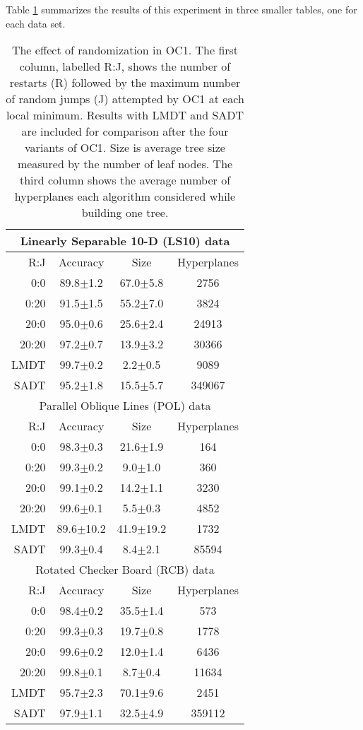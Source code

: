 Table \ref{table:2} summarizes the results of this experiment in
three smaller tables, one for each data set.
\begin{table}
\begin{center}
\begin{tabular}{|r|ccc|} \hline \hline
\multicolumn{4}{|c|}{Linearly Separable 10-D (LS10) data} \\ \hline 
R:J & Accuracy & Size  & Hyperplanes \\ \hline
0:0   & 89.8$\pm$1.2 & 67.0$\pm$5.8 & 2756 \\
0:20  & 91.5$\pm$1.5 & 55.2$\pm$7.0 & 3824 \\
20:0  & 95.0$\pm$0.6 & 25.6$\pm$2.4 & 24913 \\
20:20 & 97.2$\pm$0.7 & 13.9$\pm$3.2 & 30366 \\ \hline
LMDT  & 99.7$\pm$0.2 &  2.2$\pm$0.5 & 9089 \\ \hline
SADT  & 95.2$\pm$1.8 & 15.5$\pm$5.7 & 349067 \\ \hline  \hline
\multicolumn{4}{|c|}{Parallel Oblique Lines (POL) data} \\ \hline 
R:J & Accuracy & Size  & Hyperplanes \\ \hline
0:0   & 98.3$\pm$0.3 & 21.6$\pm$1.9 & 164 \\
0:20  & 99.3$\pm$0.2 &  9.0$\pm$1.0 & 360 \\
20:0  & 99.1$\pm$0.2 & 14.2$\pm$1.1 & 3230 \\
20:20 & 99.6$\pm$0.1 &  5.5$\pm$0.3 & 4852 \\ \hline
LMDT  & 89.6$\pm$10.2& 41.9$\pm$19.2& 1732 \\ \hline
SADT  & 99.3$\pm$0.4 &  8.4$\pm$2.1 & 85594 \\ \hline  \hline
\multicolumn{4}{|c|}{Rotated Checker Board (RCB) data} \\ \hline 
R:J & Accuracy & Size  & Hyperplanes \\ \hline
0:0   & 98.4$\pm$0.2 & 35.5$\pm$1.4 & 573 \\
0:20  & 99.3$\pm$0.3 & 19.7$\pm$0.8 & 1778 \\
20:0  & 99.6$\pm$0.2 & 12.0$\pm$1.4 & 6436 \\
20:20 & 99.8$\pm$0.1 &  8.7$\pm$0.4 & 11634 \\ \hline 
LMDT  & 95.7$\pm$2.3 & 70.1$\pm$9.6 & 2451 \\ \hline
SADT  & 97.9$\pm$1.1 & 32.5$\pm$4.9 & 359112 \\ \hline \hline
\end{tabular}
\caption{The effect of randomization in OC1\@.  The first column, 
labelled R:J, shows the number of restarts (R) followed by the maximum
number of random jumps (J) attempted by OC1 at each local minimum.
Results with LMDT and SADT are included for comparison after the four
variants of OC1.  Size is average tree size measured by the number of
leaf nodes.  The third column shows the average number of
hyperplanes each algorithm considered while building one tree.}
\label{table:2}
\vspace*{-.4in}
\end{center}
\end{table}

